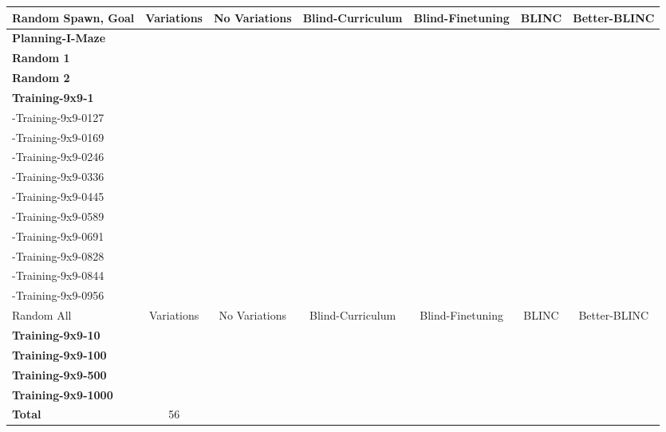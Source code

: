 \begin{table}[h]
\begin{center}
{\begin{tabular}{lcccccc}
          \midrule
            Random Spawn, Goal  & Variations & No Variations & Blind-Curriculum & Blind-Finetuning & BLINC & Better-BLINC\\
          \midrule
            \textbf{Planning-I-Maze}    &  &   &  &  &  & \\
            \textbf{Random 1}           &  &   &  &  &  & \\
            \textbf{Random 2}           &  &   &  &  &  & \\
            \textbf{Training-9x9-1}     &  &   &  &  &  & \\
            -Training-9x9-0127           &  &   &  &  &  & \\
            -Training-9x9-0169           &  &   &  &  &  & \\
            -Training-9x9-0246           &  &   &  &  &  & \\
            -Training-9x9-0336           &  &   &  &  &  & \\
            -Training-9x9-0445           &  &   &  &  &  & \\
            -Training-9x9-0589           &  &   &  &  &  & \\
            -Training-9x9-0691           &  &   &  &  &  & \\
            -Training-9x9-0828           &  &   &  &  &  & \\
            -Training-9x9-0844           &  &   &  &  &  & \\
            -Training-9x9-0956           &  &   &  &  &  & \\
          \midrule
            Random All  & Variations & No Variations & Blind-Curriculum & Blind-Finetuning & BLINC & Better-BLINC\\
          \midrule
            \textbf{Training-9x9-10}    &  &   &  &  &  & \\
            \textbf{Training-9x9-100}   &  &   &  &  &  & \\
            \textbf{Training-9x9-500}   &  &   &  &  &  & \\
            \textbf{Training-9x9-1000}  &  &   &  &  &  & \\
          \midrule                               
            \textbf{Total}  & 56 &  &  &  \\     
          \midrule                               
      \end{tabular}}                             
    \end{center}                                 
\end{table}                                      
                                                 
                                                 
                                                 
                                                 
